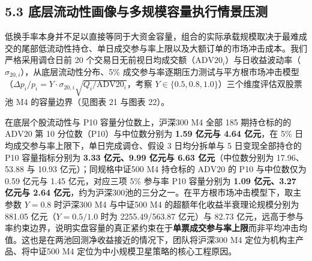 \documentclass[12pt,a4paper]{article}
\let\origsubsection\subsection
\renewcommand{\subsection}[1]{\needspace{4\baselineskip}\origsubsection{#1}}
\begin{document}
\subsection{5.3 底层流动性画像与多规模容量执行情景压测}

低换手率本身并不足以直接等同于大资金容量，组合的实际承载规模取决于最难成交的尾部低流动性持仓、单日成交参与率上限以及大额订单的市场冲击成本。我们严格采用调仓日前 20 个交易日无前视日均成交额（$\text{ADV20}_i$）与日收益波动率（$\sigma_{20,i}$），从底层流动性分布、5\% 成交参与率逐期压力测试与平方根市场冲击模型（$\Delta p_i / p_i = Y \cdot \sigma_{20,i} \sqrt{Q_i / \text{ADV20}_i}$，考察 $Y \in \{0.5, 0.8, 1.0\}$）三个维度评估双股票池 M4 的容量边界（见图表 21 与图表 22）。

在底层个股流动性与 P10 容量分位数上，沪深300 M4 全部 185 期持仓标的的 $\text{ADV20}$ 第 10 分位数（P10）与中位数分别为 \textbf{1.59 亿元与 4.64 亿元}，在 5\% 日均成交参与率上限下，单日完成调仓、假设 3 日均分拆单与 5 日变现全部持仓的 P10 容量指标分别为 \textbf{3.33 亿元、9.99 亿元与 6.63 亿元}（中位数分别为 17.96、53.88 与 10.93 亿元）；同规格中证500 M4 持仓标的 $\text{ADV20}$ 的 P10 与中位数仅为 0.59 亿元与 1.45 亿元，对应三项 5\% 参与率 P10 容量分别为 \textbf{1.09 亿元、3.27 亿元与 2.64 亿元}，约为沪深300池的三分之一。在平方根市场冲击模型下，取主参数 $Y=0.8$ 时沪深300 M4 与中证500 M4 的超额年化收益半衰理论规模分别为 881.05 亿元（$Y=0.5/1.0$ 时为 2255.49/563.87 亿元）与 82.73 亿元，远高于参与率约束边界，说明实盘容量的真正紧约束在于\textbf{单票成交参与率上限}而非平均冲击均值。这也是在两池回测净收益接近的情况下，团队将沪深300 M4 定位为机构主产品、将中证500 M4 定位为中小规模卫星策略的核心工程原因。
\end{document}
